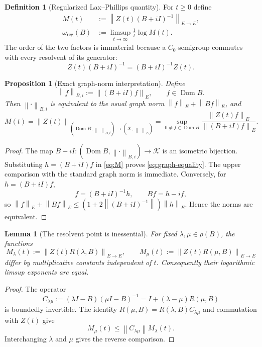 \documentclass[11pt]{amsart}
\newtheorem{proposition}[theorem]{Proposition}
\newtheorem{lemma}[theorem]{Lemma}
\theoremstyle{definition}
\newtheorem{definition}[theorem]{Definition}
\theoremstyle{remark}
\DeclareMathOperator{\Dom}{Dom}
\newcommand{\Kcal}{\mathcal K}
\newcommand{\norm}[1]{\left\lVert #1\right\rVert}
\begin{document}
\begin{definition}[Regularized Lax--Phillips quantity]
For $t\geq0$ define
\begin{align}
 M(t)&:=\norm{Z(t)(B+iI)^{-1}}_{E\to E},
 \label{eq:M}\\
 \omega_{\mathrm{reg}}(B)
 &:=\limsup_{t\to\infty}\frac1t\log M(t).
 \label{eq:omega-reg}
\end{align}
The order of the two factors is immaterial because a $C_{0}$-semigroup
commutes with every resolvent of its generator:
\[
 Z(t)(B+iI)^{-1}=(B+iI)^{-1}Z(t).
\]
\end{definition}

\begin{proposition}[Exact graph-norm interpretation]\label{prop:graph}
Define
\[
 \norm{f}_{B,i}:=\norm{(B+iI)f}_{E},\qquad f\in\Dom B.
\]
Then $\norm{\cdot}_{B,i}$ is equivalent to the usual graph norm
$\norm{f}_{E}+\norm{Bf}_{E}$, and
\begin{equation}\label{eq:graph-equality}
 M(t)=
 \norm{Z(t)}_{(\Dom B,\norm{\cdot}_{B,i})\to(\Kcal,\norm{\cdot}_{E})}
 =\sup_{0\neq f\in\Dom B}
   \frac{\norm{Z(t)f}_{E}}{\norm{(B+iI)f}_{E}}.
\end{equation}
\end{proposition}

\begin{proof}
The map $B+iI:(\Dom B,\norm{\cdot}_{B,i})\to\Kcal$ is an isometric
bijection.  Substituting $h=(B+iI)f$ in \eqref{eq:M} proves
\eqref{eq:graph-equality}.  The upper comparison with the standard graph norm
is immediate.  Conversely, for $h=(B+iI)f$,
\[
 f=(B+iI)^{-1}h,
 \qquad
 Bf=h-if,
\]
so $\norm{f}_{E}+\norm{Bf}_{E}\leq
(1+2\norm{(B+iI)^{-1}})\norm{h}_{E}$.  Hence the norms are equivalent.
\end{proof}

\begin{lemma}[The resolvent point is inessential]\label{lem:respoint}
For fixed $\lambda,\mu\in\rho(B)$, the functions
\[
 M_{\lambda}(t):=\norm{Z(t)R(\lambda,B)}_{E\to E},
 \qquad
 M_{\mu}(t):=\norm{Z(t)R(\mu,B)}_{E\to E}
\]
differ by multiplicative constants independent of $t$.  Consequently their
logarithmic limsup exponents are equal.
\end{lemma}

\begin{proof}
The operator
\[
 C_{\lambda\mu}:=(\lambda I-B)(\mu I-B)^{-1}
 =I+(\lambda-\mu)R(\mu,B)
\]
is boundedly invertible.  The identity
$R(\mu,B)=R(\lambda,B)C_{\lambda\mu}$ and commutation with $Z(t)$ give
\[
 M_{\mu}(t)\leq\norm{C_{\lambda\mu}}M_{\lambda}(t).
\]
Interchanging $\lambda$ and $\mu$ gives the reverse comparison.
\end{proof}
\end{document}
